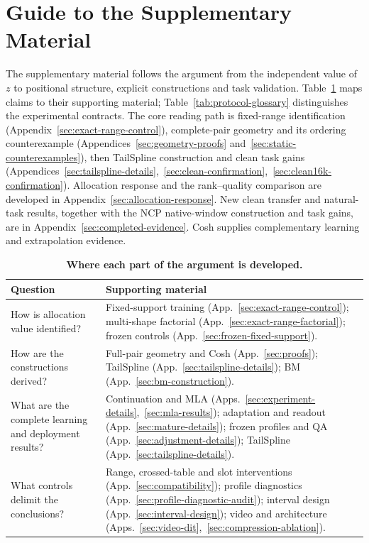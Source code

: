 \section*{Guide to the Supplementary Material}
The supplementary material follows the argument from the independent value of $z$ to positional structure, explicit constructions and task validation. Table~\ref{tab:argument-guide} maps claims to their supporting material; Table~\ref{tab:protocol-glossary} distinguishes the experimental contracts.
The core reading path is fixed-range identification (Appendix~\ref{sec:exact-range-control}), complete-pair geometry and its ordering counterexample (Appendices~\ref{sec:geometry-proofs} and~\ref{sec:static-counterexamples}), then TailSpline construction and clean task gains (Appendices~\ref{sec:tailspline-details},~\ref{sec:clean-confirmation},~\ref{sec:clean16k-confirmation}). Allocation response and the rank--quality comparison are developed in Appendix~\ref{sec:allocation-response}. New clean transfer and natural-task results, together with the NCP native-window construction and task gains, are in Appendix~\ref{sec:completed-evidence}. Cosh supplies complementary learning and extrapolation evidence.
\begin{table}[ht]
\centering\small
\caption{\textbf{Where each part of the argument is developed.}}
\label{tab:argument-guide}
\begin{tabular}{@{}>{\raggedright\arraybackslash}p{.36\linewidth}>{\raggedright\arraybackslash}p{.59\linewidth}@{}}
\toprule
Question & Supporting material \\
\midrule
How is allocation value identified? & Fixed-support training (App.~\ref{sec:exact-range-control}); multi-shape factorial (App.~\ref{sec:exact-range-factorial}); frozen controls (App.~\ref{sec:frozen-fixed-support}). \\
How are the constructions derived? & Full-pair geometry and Cosh (App.~\ref{sec:proofs}); TailSpline (App.~\ref{sec:tailspline-details}); BM (App.~\ref{sec:bm-construction}). \\
What are the complete learning and deployment results? & Continuation and MLA (Apps.~\ref{sec:experiment-details},~\ref{sec:mla-results}); adaptation and readout (App.~\ref{sec:mature-details}); frozen profiles and QA (App.~\ref{sec:adjustment-details}); TailSpline (App.~\ref{sec:tailspline-details}). \\
What controls delimit the conclusions? & Range, crossed-table and slot interventions (App.~\ref{sec:compatibility}); profile diagnostics (App.~\ref{sec:profile-diagnostic-audit}); interval design (App.~\ref{sec:interval-design}); video and architecture (Apps.~\ref{sec:video-dit},~\ref{sec:compression-ablation}). \\
\bottomrule
\end{tabular}
\end{table}
\FloatBarrier

